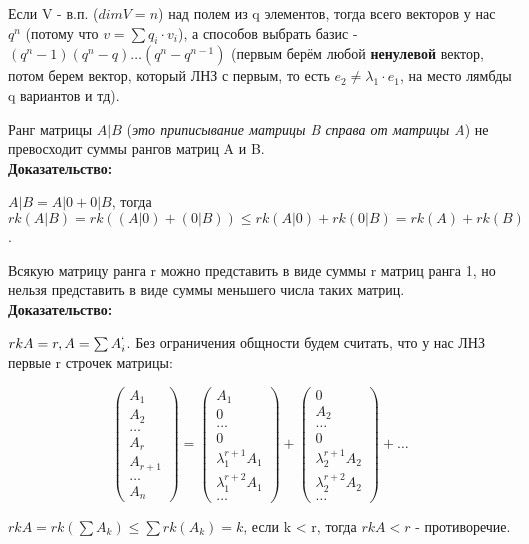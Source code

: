 \documentclass[12pt]{article}
\begin{document}
\begin{remarkbox}
Если V - в.п. ($dimV = n$) над полем из q элементов, тогда всего векторов у нас $q^n$ (потому что $v = \sum q_i \cdot v_i$), а способов выбрать базис - $(q^n - 1)(q^n - q)\dots(q^n - q^{n - 1})$ (первым берём любой \textbf{ненулевой} вектор, потом берем вектор, который ЛНЗ с первым, то есть $e_2 \neq \lambda_1\cdot e_1$, на место лямбды q вариантов и тд).
\end{remarkbox}

\begin{theorembox}
Ранг матрицы $A|B$ (\textit{это приписывание матрицы B справа от матрицы A}) не превосходит суммы рангов матриц A и B.\\

\textbf{Доказательство:}

$A|B = A|0 + 0|B$, тогда $rk(A|B) = rk((A|0) + (0|B)) \leq rk(A|0) + rk(0|B) = rk(A) + rk(B)$.
\end{theorembox}

\begin{theorembox}
Всякую матрицу ранга r можно представить в виде суммы r матриц ранга 1, но нельзя представить в виде суммы меньшего числа таких матриц.\\

\textbf{Доказательство:}

$rkA = r, A = \sum A^`_i$. Без ограничения общности будем считать, что у нас ЛНЗ первые r строчек матрицы:

\[
\begin{pmatrix}
A_1 \\
A_2 \\
\dots \\
A_r\\
A_{r + 1}\\
\dots\\
A_n
\end{pmatrix}
=
\begin{pmatrix}
A_1 \\
0 \\
\dots \\
0\\
\lambda_1^{r+1} A_1\\
\lambda_1^{r+2} A_1\\
\dots
\end{pmatrix}
+
\begin{pmatrix}
0 \\
A_2 \\
\dots \\
0\\
\lambda_2^{r+1} A_2\\
\lambda_2^{r+2} A_2\\
\dots
\end{pmatrix}
+
\dots
\]

$rkA = rk(\sum A_k) \leq \sum rk(A_k) = k$, если k < r, тогда $rkA < r$ - противоречие.
\end{theorembox}
\end{document}
